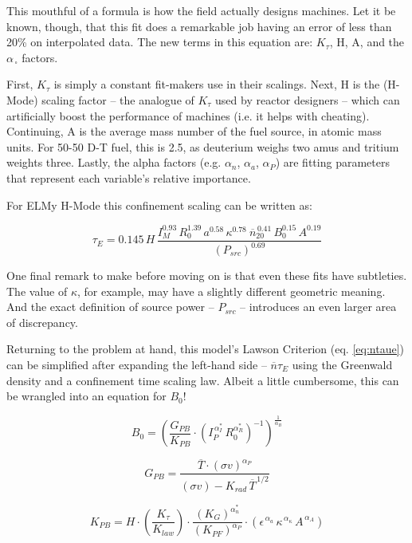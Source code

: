 This mouthful of a formula is how the field actually designs machines. Let it be known, though, that this fit does a remarkable job having an error of less than 20\% on interpolated data. The new terms in this equation are: $K_\tau$, H, A, and the $\alpha_{\,\square}$ factors. 

First, $K_\tau$ is simply a constant fit-makers use in their scalings. Next, H is the (H-Mode) scaling factor -- the analogue of $K_\tau$ used by reactor designers -- which can artificially boost the performance of machines (i.e. it helps with cheating). Continuing, A is the average mass number of the fuel source, in atomic mass units. For 50-50 D-T fuel, this is 2.5, as deuterium weighs two amus and tritium weights three. Lastly, the alpha factors (e.g. $\alpha_n$, $\alpha_a$, $\alpha_P$) are fitting parameters that represent each variable's relative importance. 

For ELMy H-Mode this confinement scaling can be written as:

\begin{equation}
	\tau_E = 0.145 \, H \, \frac{
		I_M^{0.93} \, R_0^{1.39} \, a^{0.58} \, \kappa^{0.78} \ \overline{n}_{20}^{\, 0.41} \, B_0^{0.15} \, A^{0.19}
	}{ ( P_{src} ) ^ {0.69} }
\end{equation}

One final remark to make before moving on is that even these fits have subtleties. The value of $\kappa$, for example, may have a slightly different geometric meaning. And the exact definition of source power -- $P_{src}$ -- introduces an even larger area of discrepancy. 

Returning to the problem at hand, this model's Lawson Criterion (eq. \ref{eq:ntaue}) can be simplified after expanding the left-hand side -- $\overline n \tau_E $ using the Greenwald density and a confinement time scaling law. Albeit a little cumbersome, this can be wrangled into an equation for $B_0$!

\begin{equation}
	B_0 = \left( \frac{ G_{PB} }{ K_{PB} } \cdot \left( I_P^{\,\alpha_I^*} \, R_0^{ \alpha_R^* } \right)^{-1} \right) ^ { \frac{1}{ \alpha_B } }
\end{equation}

\begin{equation}
	G_{PB} = \frac{ \overline{T} \cdot  (\sigma v) ^ {\alpha_P} } { (\sigma v) - K_{rad} \, \overline{T}^{  \,1/2 } }
\end{equation}

\begin{equation}
	K_{PB} = H \cdot \left( \frac{ K_\tau  }{ K_{law} } \right) \cdot \frac{ \left( K_{G} \right)^{\alpha_n^*} }{ ( K_{PF} ) ^ {\alpha_P} } \cdot \left( 
     \epsilon^{\,\alpha_a} \, \kappa^{\,\alpha_\kappa} \, A^{\,\alpha_A}\right)
\end{equation}


